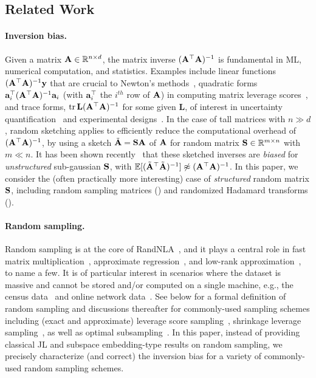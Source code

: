 \documentclass[11pt,a4paper]{article}
\begin{document}
\subsection{Related Work}
\label{subsec:related}



\paragraph{Inversion bias.}  
Given a matrix $\A \in \RR^{n \times d}$, the matrix inverse $(\A^\top\A)^{-1}$ is fundamental in ML, numerical computation, and statistics.  
Examples include linear functions $(\A^\top\A)^{-1}\y$ that are crucial to Newton's methods~\citep{boyd2004convex}, quadratic forms $\ba_i^\top(\A^\top\A)^{-1}\ba_i$ (with $\ba^\top_i$ the $i^{th}$ row of $\A$) in computing matrix leverage scores~\citep{drineas2012fast}, and trace forms, $\tr \mathbf{L} (\A^\top\A)^{-1} $ for some given $\mathbf{L}$, of interest in uncertainty quantification~\citep{kalantzis2013Accelerating} and experimental designs~\citep{pukelsheim2006optimal}.  
In the case of tall matrices with $n\gg d$, random sketching applies to efficiently reduce the computational overhead of $(\A^\top\A)^{-1}$, by using a sketch $\tilde\A=\S\A$ of $\A$ for random matrix $\S\in\RR^{m\times n}$ with $m\ll n$. 
It has been shown recently~\citep{michal2020precise,derezinski2021newtonless,derezinski2021sparse} that these sketched inverses are \emph{biased} for \emph{unstructured} sub-gaussian $\S$, with $\EE[(\tilde \A^\top\tilde \A)^{-1}] \not \approx (\A^\top\A)^{-1}$. 
In this paper, we consider the (often practically more interesting) case of \emph{structured} random matrix $\S$, including random sampling matrices () and randomized Hadamard transforms ().


\paragraph{Random sampling.}
Random sampling is at the core of RandNLA~\citep{drineas2006fast1,mahoney2011randomized,ma2015statistical,DM16_CACM,DM21_NoticesAMS,randnla_kdd24_TR}, and it plays a central role in fast matrix multiplication~\citep{drineas2006fast1}, approximate regression~\citep{drineas2006sampling}, and low-rank approximation~\citep{cohen2017input}, to name a few. 
It is of particular interest in scenarios where the dataset is massive and cannot be stored and/or computed on a single machine, e.g., the census data~\citep{wang2018optimal} and online network data~\citep{deng2024subsampling}.
See  below for a formal definition of random sampling and discussions thereafter for commonly-used sampling schemes including (exact and approximate) leverage score sampling~\citep{mahoney2011randomized,cohen2017input}, shrinkage leverage sampling~\citep{ma2015statistical}, as well as optimal subsampling~\citep{wang2018optimal,wang2021optimal,yu2022optimal,ma2022asymptotic}. 
In this paper, instead of providing classical JL and subspace embedding-type results on random sampling, we precisely characterize (and correct) the inversion bias for a variety of commonly-used random sampling schemes.
 
\end{document}
